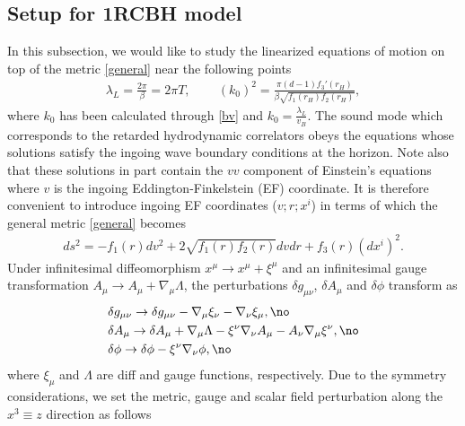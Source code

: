 \documentclass[preprintnumbers,aps,prd,longbibliography,nofootinbib,nobibnotes,amsmath,amssymb]{revtex4}
\begin{document}
\subsection{Setup for 1RCBH model}
In this subsection, we would like to study the linearized equations of motion on top of the metric  \eqref{general} near the following  points
\begin{align}
\lambda_{L}=\frac{2\pi}{\beta}=2\pi T, \,\,\,\,\,\,\,\,\,\,\,\,\,(k_{0})^{2}=\frac{\pi (d-1)f_3'(r_H)}{\beta \sqrt{f_1(r_H)f_2(r_H)}},
\end{align}
where $k_{0}$ has been calculated through \eqref{bv} and $k_{0}=\frac{\lambda_{L}}{v_B}$.  %
The sound mode which corresponds to the retarded hydrodynamic correlators obeys the equations whose solutions satisfy the ingoing wave boundary conditions at the horizon. Note also that  these solutions in part contain the $vv$ component of Einstein’s equations  where $v$ is the ingoing Eddington-Finkelstein (EF) coordinate. It is therefore convenient to introduce ingoing  EF coordinates ($v; r; x^{i}$) in terms of which the general metric \eqref{general} becomes 
\begin{align}\label{ef}
ds^2=-f_1(r)dv^2+2\sqrt{f_1(r)f_2(r)}dvdr+f_3(r)(dx^{i})^2.
\end{align}
 Under infinitesimal diffeomorphism $x^{\mu}\rightarrow x^{\mu}+\xi^{\mu}$ and an infinitesimal gauge transformation $A_{\mu}\rightarrow A_{\mu}+ \nabla_{\mu}\Lambda$, the perturbations $\delta g_{\mu \nu}$, $\delta A_{\mu }$ and $\delta \phi$ transform  as
\begin{align}
&\delta g_{\mu \nu}\rightarrow \delta g_{\mu \nu}- \nabla_{\mu}\xi _{\nu}-\nabla_{\nu}\xi _{\mu}, \no\\ 
&\delta A_{\mu}\rightarrow \delta A_{\mu}+ \nabla_{\mu} \Lambda - \xi ^{\nu}\nabla_{\nu} A_{\mu}- A_{\nu}\nabla_{\mu}\xi^{\nu}, \no\\
&\delta \phi \rightarrow \delta \phi -\xi ^{\nu} \nabla_{\nu} \phi , \no
\end{align}
where $\xi _{\mu}$ and $\Lambda$ are diff and gauge functions, respectively. %
Due to the symmetry considerations, we  set the   metric, gauge and scalar field perturbation along the $x^{3}\equiv z$ direction as follows
\end{document}
